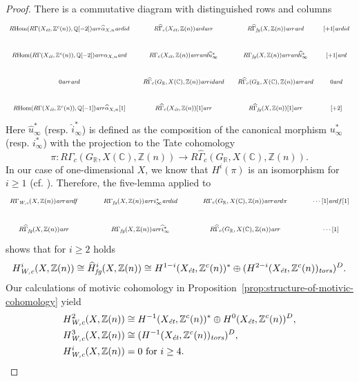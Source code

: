 \documentclass{article}
\DeclareMathOperator{\Hom}{Hom}
\newcommand{\CC}{\mathbb{C}}
\newcommand{\QQ}{\mathbb{Q}}
\newcommand{\RR}{\mathbb{R}}
\newcommand{\ZZ}{\mathbb{Z}}
\newcommand{\ar}{\text{\it ar}}
\newcommand{\et}{\text{\it \'{e}t}}
\newcommand{\fg}{\text{\it fg}}
\newcommand{\tors}{\text{\it tors}}
\newcommand{\Wc}{\text{\it W,c}}
\newcommand{\RHom}{R\!\Hom}
\theoremstyle{myplain}
\theoremstyle{mydefinition}
\begin{document}
\begin{proof}
  There is a commutative diagram with distinguished rows and columns
  \[ \begin{tikzcd}[font=\footnotesize,column sep=1em]
      \RHom (R\Gamma (X_\et, \ZZ^c(n)), \QQ[-2]) \ar{r}{\widehat{\alpha}_{X,n}} \ar{d}{id} &[0pt] R\widehat{\Gamma}_c (X_\et, \ZZ(n)) \ar{d} \ar{r} & R\widehat{\Gamma}_\fg (X, \ZZ(n)) \ar{r}\ar{d} &[-0.5em] {[+1]} \ar{d}{id} \\
      \RHom (R\Gamma (X_\et, \ZZ^c(n)), \QQ[-2]) \ar{r}{\alpha_{X,n}} \ar{d} & R\Gamma_c (X_\et, \ZZ(n)) \ar{r} \ar{d}{\widehat{u}^*_\infty} & R\Gamma_\fg (X, \ZZ(n)) \ar{r} \ar{d}{\widehat{i}^*_\infty} & {[+1]} \ar{d} \\
      0 \ar{r}\ar{d} & R\widehat{\Gamma}_c (G_\RR, X(\CC), \ZZ(n)) \ar{r}{id} \ar{d} & R\widehat{\Gamma}_c (G_\RR, X(\CC), \ZZ(n)) \ar{r} \ar{d} & 0 \ar{d} \\
      \RHom (R\Gamma (X_\et, \ZZ^c(n)), \QQ[-1]) \ar{r}{\widehat{\alpha}_{X,n} [1]} & R\widehat{\Gamma}_c (X_\et, \ZZ(n)) [1] \ar{r} & R\widehat{\Gamma}_\fg (X, \ZZ(n)) [1] \ar{r} & {[+2]}
    \end{tikzcd} \]
  Here $\widehat{u}^*_\infty$ (resp. $\widehat{i}^*_\infty$)
  is defined as the composition of the canonical morphism $u^*_\infty$
  (resp. $i^*_\infty$) with the projection to the Tate cohomology
  \[
    \pi\colon R\Gamma_c (G_\RR, X(\CC), \ZZ(n)) \to
    R\widehat{\Gamma}_c (G_\RR, X(\CC), \ZZ(n)).
  \]
  In our case of one-dimensional $X$, we know that $H^i (\pi)$ is an isomorphism
  for $i \ge 1$ (cf. \cite[Proposition~3.2]{Beshenov-Weil-etale-1}). Therefore,
  the five-lemma applied to
  \[ \begin{tikzcd}[font=\footnotesize]
      R\Gamma_\Wc (X, \ZZ(n)) \ar{r}\ar{d}{f} & R\Gamma_\fg (X, \ZZ(n)) \ar{r}{i^*_\infty}\ar{d}{id} & R\Gamma_c (G_\RR, X(\CC), \ZZ(n)) \ar{r}\ar{d}{\pi} & \cdots [1]\ar{d}{f [1]} \\
      R\widehat{\Gamma}_\fg (X, \ZZ(n)) \ar{r} & R\Gamma_\fg (X, \ZZ(n)) \ar{r}{\widehat{i}^*_\infty} & R\widehat{\Gamma}_c (G_\RR, X(\CC), \ZZ(n)) \ar{r} & \cdots [1]
    \end{tikzcd} \]
  shows that for $i \ge 2$ holds
  \[ H^i_\Wc (X, \ZZ(n)) \cong \widehat{H}^i_\fg (X, \ZZ(n))
    \cong H^{1-i} (X_\et, \ZZ^c(n))^*
    \oplus
    (H^{2-i} (X_\et, \ZZ^c (n))_\tors)^D. \]
  Our calculations of motivic cohomology in
  Proposition~\ref{prop:structure-of-motivic-cohomology} yield
  \begin{align*}
    H^2_\Wc (X, \ZZ(n)) & \cong H^{-1} (X_\et, \ZZ^c(n))^*
                          \oplus
                          H^0 (X_\et, \ZZ^c (n))^D, \\
    H^3_\Wc (X, \ZZ(n)) & \cong (H^{-1} (X_\et, \ZZ^c (n))_\tors)^D, \\
    H^i_\Wc (X, \ZZ(n)) & = 0 \text{ for }i \ge 4. \qedhere
  \end{align*}
\end{proof}
\end{document}
